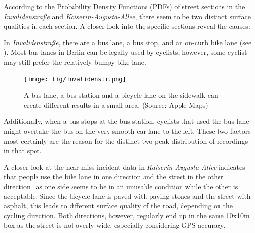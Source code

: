 According to the Probability Density Functions (PDFs) of street sections in the \textit{Invalidenstraße} and \textit{Kaiserin-Augusta-Allee}, there seem to be two distinct surface qualities in each section.
A closer look into the specific sections reveal the causes:
 
\begin{table}%
\centering
\caption{Surface Quality Analysis Evaluation Results Showing Mean, Median and Standard Deviation of Sections With Mixed Results}%
\label{tab:mixed}
\end{table}

In \textit{Invalidenstraße}, there are a bus lane, a bus stop, and an on-curb bike lane (see ).
Most bus lanes in Berlin can be legally used by cyclists, however, some cyclist may still prefer the relatively bumpy bike lane.
\begin{figure}
    \centering
    \texttt{[image: fig/invalidenstr.png]}
    \caption{%
        A bus lane, a bus station and a bicycle lane on the sidewalk can create different results in a small area. (Source: Apple Maps)
    }%
    \label{fig:invaliden}
\end{figure}
Additionally, when a bus stops at the bus station, cyclists that used the bus lane might overtake the bus on the very smooth car lane to the left. 
These two factors most certainly are the reason for the distinct two-peak distribution of recordings in that spot.

A closer look at the near-miss incident data in \textit{Kaiserin-Augusta-Allee} indicates that people use the bike lane in one direction and the street in the other direction~\cite{dataset_simra_set1,dataset_simra_set2,dataset_simra_set3} as one side seems to be in an unusable condition while the other is acceptable.
Since the bicycle lane is paved with paving stones and the street with asphalt, this leads to different surface quality of the road, depending on the cycling direction.
Both directions, however, regularly end up in the same 10x10m box as the street is not overly wide, especially considering GPS accuracy.


